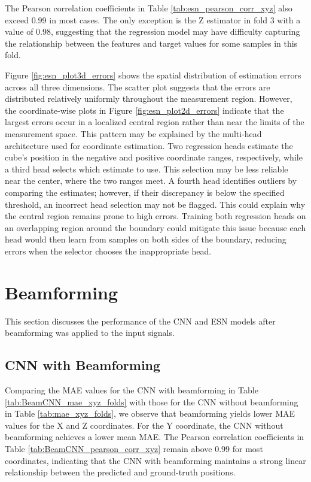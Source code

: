 The Pearson correlation coefficients in Table \ref{tab:esn_pearson_corr_xyz} also exceed 0.99 in most cases. The only exception is the Z estimator in fold 3 with a value of 0.98, suggesting that the regression model may have difficulty capturing the relationship between the features and target values for some samples in this fold.

Figure \ref{fig:esn_plot3d_errors} shows the spatial distribution of estimation errors across all three dimensions. The scatter plot suggests that the errors are distributed relatively uniformly throughout the measurement region. However, the coordinate-wise plots in Figure \ref{fig:esn_plot2d_errors} indicate that the largest errors occur in a localized central region rather than near the limits of the measurement space. This pattern may be explained by the multi-head architecture used for coordinate estimation. Two regression heads estimate the cube's position in the negative and positive coordinate ranges, respectively, while a third head selects which estimate to use. This selection may be less reliable near the center, where the two ranges meet. A fourth head identifies outliers by comparing the estimates; however, if their discrepancy is below the specified threshold, an incorrect head selection may not be flagged. This could explain why the central region remains prone to high errors. Training both regression heads on an overlapping region around the boundary could mitigate this issue because each head would then learn from samples on both sides of the boundary, reducing errors when the selector chooses the inappropriate head.


\section{Beamforming}

This section discusses the performance of the CNN and ESN models after beamforming was applied to the input signals.

\subsection{CNN with Beamforming}

Comparing the MAE values for the CNN with beamforming in Table \ref{tab:BeamCNN_mae_xyz_folds} with those for the CNN without beamforming in Table \ref{tab:mae_xyz_folds}, we observe that beamforming yields lower MAE values for the X and Z coordinates. For the Y coordinate, the CNN without beamforming achieves a lower mean MAE. The Pearson correlation coefficients in Table \ref{tab:BeamCNN_pearson_corr_xyz} remain above 0.99 for most coordinates, indicating that the CNN with beamforming maintains a strong linear relationship between the predicted and ground-truth positions. 

